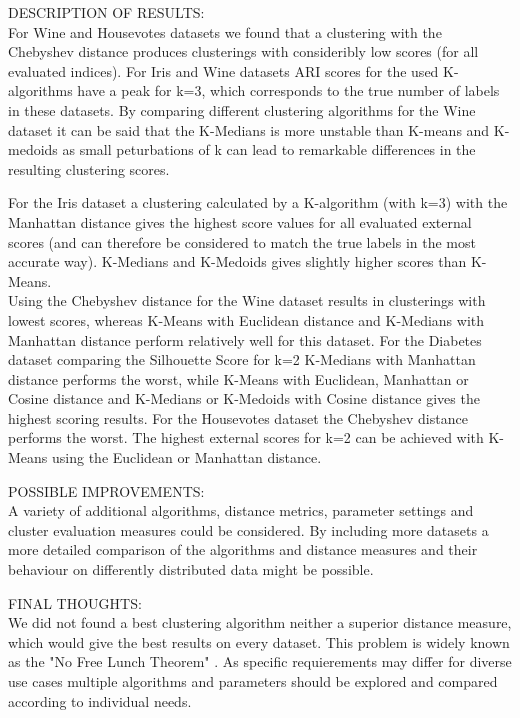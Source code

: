 DESCRIPTION OF RESULTS: \\ 

For Wine and Housevotes datasets we found that a clustering with the Chebyshev distance produces clusterings with consideribly low scores (for all evaluated indices). 
For Iris and Wine datasets ARI scores for the used K-algorithms have a peak for k=3, which corresponds to the true number of labels in these datasets.  
By comparing different clustering algorithms for the Wine dataset it can be said that the K-Medians is more unstable than K-means and K-medoids as small peturbations of k can lead to remarkable differences in the resulting clustering scores. 


For the Iris dataset a clustering calculated by a K-algorithm (with k=3) with the Manhattan distance gives the highest score values for all evaluated external scores (and can therefore be considered to match the true labels in the most accurate way). K-Medians and K-Medoids gives slightly higher scores than K-Means.  \\
Using the Chebyshev distance for the Wine dataset results in clusterings with lowest scores, whereas K-Means with Euclidean distance and K-Medians with Manhattan distance perform relatively well for this dataset.  
For the Diabetes dataset comparing the Silhouette Score for k=2 K-Medians with Manhattan distance performs the worst, while K-Means with Euclidean, Manhattan or Cosine distance and K-Medians or K-Medoids with Cosine distance gives the highest scoring results. 
For the Housevotes dataset the Chebyshev distance performs the worst. The highest external scores for k=2 can be achieved with K-Means using the Euclidean or Manhattan distance. 




POSSIBLE IMPROVEMENTS:\\
A variety of additional algorithms, distance metrics, parameter settings and cluster evaluation measures could be considered. By including more datasets a more detailed comparison of the algorithms and distance measures and their behaviour on differently distributed data might be possible. 

FINAL THOUGHTS: \\

We did not found a best clustering algorithm neither a superior distance measure, which would give the best results on every dataset. This problem is widely known as the "No Free Lunch Theorem" \cite{nofreelunch}. As specific requierements may differ for diverse use cases multiple algorithms and parameters should be explored and compared according to individual needs. 